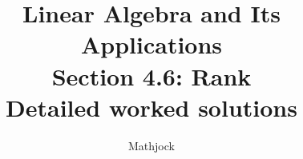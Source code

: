 
\title{\textbf{Linear Algebra and Its Applications}\\[0.3em]Section 4.6: Rank\\[0.3em]\large Detailed worked solutions}
\author{Mathjock}
\date{}

\maketitle
\bookinfo
\tableofcontents
\clearpage
\renewcommand{\thesection}{4.\arabic{section}}
\renewcommand{\theHsection}{4.\arabic{section}}
\setcounter{section}{5}


